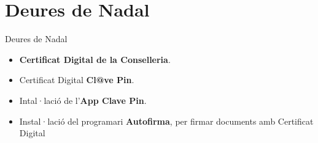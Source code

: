 \documentclass[xcolor=dvipsnames]{beamer}
\begin{document}
\section{Deures de Nadal}
\begin{frame}{Deures de Nadal}

\begin{itemize}
\item<1->
  \textbf{Certificat Digital de la Conselleria}.
\item<2->
  Certificat Digital \textbf{Cl@ve Pin}.
\item<3->
  Intal·lació de l'\textbf{App Clave Pin}.
\item<4->
  Instal·lació del programari \textbf{Autofirma}, per firmar documents amb
  Certificat Digital
\end{itemize}
\end{frame}
\end{document}
